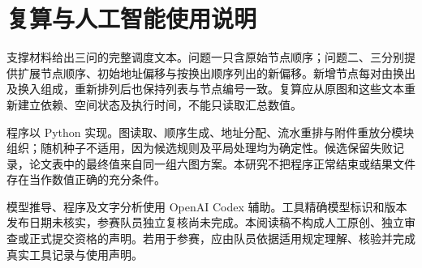 \section{复算与人工智能使用说明}
支撑材料给出三问的完整调度文本。问题一只含原始节点顺序；问题二、三分别提供扩展节点顺序、初始地址偏移与按换出顺序列出的新偏移。新增节点每对由换出及换入组成，重新排列后也保持列表与节点编号一致。复算应从原图和这些文本重新建立依赖、空间状态及执行时间，不能只读取汇总数值。

程序以 Python 实现。图读取、顺序生成、地址分配、流水重排与附件重放分模块组织；随机种子不适用，因为候选规则及平局处理均为确定性。候选保留失败记录，论文表中的最终值来自同一组六图方案。本研究不把程序正常结束或结果文件存在当作数值正确的充分条件。

模型推导、程序及文字分析使用 OpenAI Codex 辅助。工具精确模型标识和版本发布日期未核实，参赛队员独立复核尚未完成。本阅读稿不构成人工原创、独立审查或正式提交资格的声明。若用于参赛，应由队员依据适用规定理解、核验并完成真实工具记录与使用声明\cite{ai}。
